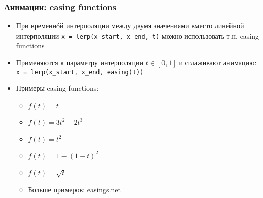 \documentclass{beamer}
\begin{document}
\begin{frame}[fragile]
\frametitle{Анимации: easing functions}
\begin{itemize}
\item При временнóй интерполяции между двумя значениями вместо линейной интерполяции \verb|x = lerp(x_start, x_end, t)| можно использовать т.н. easing functions
\pause
\item Применяются к параметру интерполяции \begin{math}t \in [0, 1]\end{math} и сглаживают анимацию: \verb|x = lerp(x_start, x_end, easing(t))|
\pause
\item Примеры easing functions:
\begin{itemize}
\item \begin{math}f(t) = t\end{math}
\item \begin{math}f(t) = 3t^2-2t^3\end{math}
\item \begin{math}f(t) = t^2\end{math}
\item \begin{math}f(t) = 1 - (1-t)^2\end{math}
\item \begin{math}f(t) = \sqrt{t}\end{math}
\item Больше примеров: \href{https://easings.net}{easings.net}
\end{itemize}
\end{itemize}
\end{frame}
\end{document}
